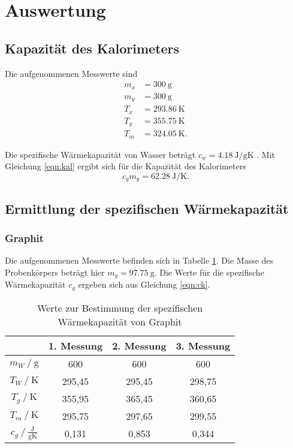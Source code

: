 \section{Auswertung}

\subsection{Kapazität des Kalorimeters}

Die aufgenommenen Messwerte sind
\begin{align*}
  m_x &= \SI{300}{\g}       \\
  m_y &= \SI{300}{\g} \\
  T_x &= \SI{293,86}{\K} \\
  T_y &= \SI{355,75}{\K} \\
  T_m &= \SI{324,05}{\K}.
\end{align*}

Die spezifische Wärmekapazität von Wasser beträgt $c_w = \SI{4,18}{\joule \per \gram \kelvin}$ \cite[159]{sample1}.
Mit Gleichung \eqref{eqn:kal} ergibt sich für die Kapazität des Kalorimeters
\begin{equation*}
  c_g m_g = \SI{62,28}{\joule \per \kelvin}.
\end{equation*}

\subsection{Ermittlung der spezifischen Wärmekapazität}

\subsubsection{Graphit}

Die aufgenommenen Messwerte befinden sich in Tabelle \ref{tab:graphit}. Die Masse des Probenkörpers beträgt hier
$m_g = \SI{97,75}{\g}$.
Die Werte für die spezifische Wärmekapazität $c_g$ ergeben sich aus Gleichung \eqref{eqn:ck}.
\begin{table}[H]
  \centering
  \caption{Werte zur Bestimmung der spezifischen Wärmekapazität von Graphit}
  \label{tab:graphit}
  \begin{tabular}{c c c c}
    \toprule
       & {1. Messung} & {2. Messung} & {3. Messung}\\
    \midrule
       $m_W \:/\: \mathrm{g}$ & 600 & 600 & 600 \\
       $T_W \:/\: \mathrm{K}$ & 295,45 & 295,45 & 298,75 \\
       $T_g \:/\: \mathrm{K}$ & 355,95 & 365,45 & 360,65 \\
       $T_m \:/\: \mathrm{K}$ & 295,75 & 297,65 & 299,55 \\
       $c_g \:/\: \mathrm{\frac{J}{g K}}$ & 0,131 & 0,853 & 0,344 \\
    \bottomrule
  \end{tabular}
\end{table}

